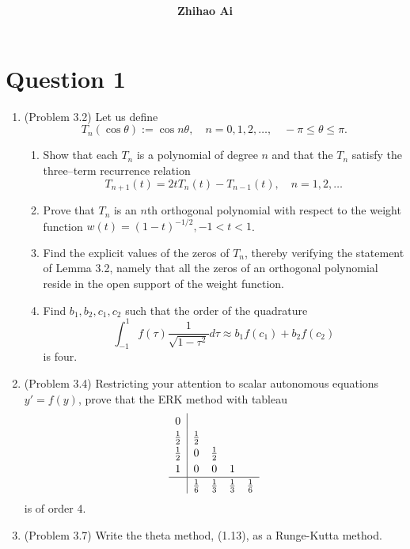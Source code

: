 \documentclass[10pt]{report}
\title{
	\vspace{2in}
	\textmd{\textbf{\hwCourse\\\hwTitle}}\\
	\vspace{0.3in}\large{\textit{\hmwkClassInstructor}}
	\vspace{3in}
}
\author{\textbf{Zhihao Ai}}
\date{}
\newcommand{\dintt}[4] {\int_{#1}^{#2} #3 d#4}
\begin{document}
\maketitle

\section*{Question 1}
\begin{enumerate}
	\item 
	(Problem 3.2) Let us define
	\[
	T_n(\cos{\theta}) := \cos{n\theta},\quad n = 0,1,2,\dots, \quad -\pi\le \theta\le \pi.
	\]
	\begin{enumerate}
		\item 
		Show that each $T_n$ is a polynomial of degree $n$ and that the $T_n$ satisfy the three–term recurrence relation
		\[
		T_{n+1}(t) = 2tT_n(t) - T_{n-1}(t),\quad n=1,2,\dots
		\]
		
		\item 
		Prove that $T_n$ is an $n$th orthogonal polynomial with respect to the weight function $w(t)=(1-t)^{-1/2}, -1<t<1$.
		
		\item 
		Find the explicit values of the zeros of $T_n$, thereby verifying the statement of Lemma 3.2, namely that all the zeros of an orthogonal polynomial reside in the open support of the weight function.
		
		\item 
		Find $b_1, b_2, c_1, c_2$ such that the order of the quadrature
		\[
		\dintt{-1}{1}{f(\tau) \frac{1}{\sqrt{1-\tau^2}}}{\tau} \approx b_1 f(c_1) + b_2 f(c_2)
		\]
		is four. 
	\end{enumerate}

	\item 
	(Problem 3.4) Restricting your attention to scalar autonomous equations $y' = f(y)$, prove that the ERK method with tableau
	\[
	\renewcommand{\arraystretch}{1.2}
	\begin{array}{c|cccc}
		0 &&&&\\
		\frac{1}{2} & \frac{1}{2} &&&\\
		\frac{1}{2} & 0 & \frac{1}{2} &&\\
		1 & 0 & 0 & 1 &\\ \hline
		& \frac{1}{6} & \frac{1}{3} & \frac{1}{3} & \frac{1}{6}
	\end{array}
	\]
	is of order 4.
	
	\item 
	(Problem 3.7) Write the theta method, (1.13), as a Runge-Kutta method.
\end{enumerate}
\end{document}
